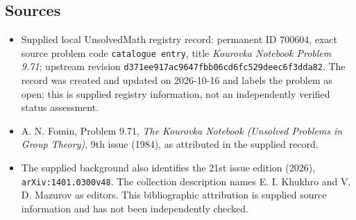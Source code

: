 \documentclass[11pt]{article}
\begin{document}
\subsection{Sources}
\begin{itemize}
\item Supplied local UnsolvedMath registry record: permanent ID \(700604\), exact source problem code \texttt{catalogue entry}, title \emph{Kourovka Notebook Problem 9.71}; upstream revision \texttt{d371ee917ac9647fbb06cd6fc529deec6f3dda82}. The record was created and updated on 2026-10-16 and labels the problem as open; this is supplied registry information, not an independently verified status assessment.
\item A. N. Fomin, Problem 9.71, \emph{The Kourovka Notebook (Unsolved Problems in Group Theory)}, 9th issue (1984), as attributed in the supplied record.
\item The supplied background also identifies the 21st issue edition (2026), \texttt{arXiv:1401.0300v48}. The collection description names E. I. Khukhro and V. D. Mazurov as editors. This bibliographic attribution is supplied source information and has not been independently checked.
\end{itemize}
\end{document}
